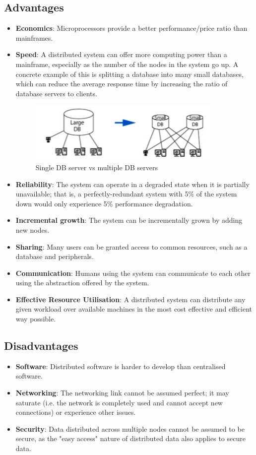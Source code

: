 \subsection{Advantages}
\begin{itemize}
\item \textbf{Economics}: Microprocessors provide a better performance/price ratio than mainframes.
\item \textbf{Speed}: A distributed system can offer more computing power than a mainframe, especially as the number of the nodes in the system go up. A concrete example of this is splitting a database into many small databases, which can reduce the average response time by increasing the ratio of database servers to clients.\begin{figure}[h]
\centering
\includegraphics[width=0.5\linewidth]{figures/screenshot008}
\caption{Single DB server vs multiple DB servers}
\label{fig:screenshot008}
\end{figure}
\item \textbf{Reliability}: The system can operate in a degraded state when it is partially unavailable; that is, a perfectly-redundant system with 5\% of the system down would only experience 5\% performance degradation.
\item \textbf{Incremental growth}: The system can be incrementally grown by adding new nodes.
\item \textbf{Sharing}: Many users can be granted access to common resources, such as a database and peripherals.
\item \textbf{Communication}: Humans using the system can communicate to each other using the abstraction offered by the system.
\item \textbf{Effective Resource Utilisation}: A distributed system can distribute any given workload over available machines in the most cost effective and efficient way possible.
\end{itemize}

\subsection{Disadvantages}
\begin{itemize}
\item \textbf{Software}: Distributed software is harder to develop than centralised software.
\item \textbf{Networking}: The networking link cannot be assumed perfect; it may saturate (i.e. the network is completely used and cannot accept new connections) or experience other issues.
\item \textbf{Security}: Data distributed across multiple nodes cannot be assumed to be secure, as the "easy access" nature of distributed data also applies to secure data.
\end{itemize}


